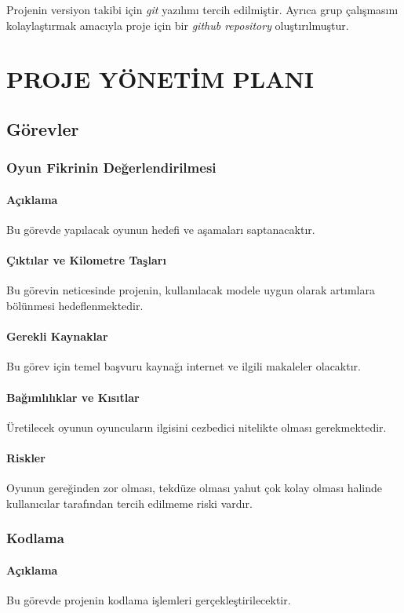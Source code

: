 \documentclass[12pt,a4paper]{article}
\begin{document}
   Projenin versiyon takibi için \textit{git} yazılımı tercih edilmiştir. Ayrıca grup çalışmasını kolaylaştırmak amacıyla proje için bir \textit{github repository} oluştırılmuştur.

   \section{PROJE YÖNETİM PLANI}
   \subsection{Görevler}
   \subsubsection{Oyun Fikrinin Değerlendirilmesi}
   \paragraph{Açıklama}
   Bu görevde yapılacak oyunun hedefi ve aşamaları saptanacaktır.
   \paragraph{Çıktılar ve Kilometre Taşları}
   Bu görevin neticesinde projenin, kullanılacak modele uygun olarak artımlara bölünmesi hedeflenmektedir.
   \paragraph{Gerekli Kaynaklar}
   Bu görev için temel başvuru kaynağı internet ve ilgili makaleler olacaktır.
   \paragraph{Bağımlılıklar ve Kısıtlar}
   Üretilecek oyunun oyuncuların ilgisini cezbedici nitelikte olması gerekmektedir.
   \paragraph{Riskler}
   Oyunun gereğinden zor olması, tekdüze olması yahut çok kolay olması halinde kullanıcılar tarafından tercih edilmeme riski vardır.

   \subsubsection{Kodlama}
   \paragraph{Açıklama}
   Bu görevde projenin kodlama işlemleri gerçekleştirilecektir.
\end{document}
